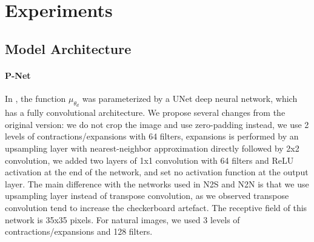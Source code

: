 \documentclass{article}
\begin{document}


\section{Experiments}
\subsection{Model Architecture}
\paragraph{P-Net}
In \cite{ronneberger2015u}, the function $\mu_{\theta_d}$ was parameterized by a UNet  deep neural network, which has a fully convolutional architecture.
We propose several changes from the original version: we do not crop the image and use zero-padding instead, we use 2 levels of contractions/expansions with 64 filters, expansions is performed by an upsampling layer with nearest-neighbor approximation directly followed by 2x2 convolution, we added two layers of 1x1 convolution with 64 filters and ReLU activation at the end of the network, and set no activation function at the output layer.
The main difference with the networks used in N2S and N2N is that we use upsampling layer instead of transpose convolution, as we observed transpose convolution tend to increase the checkerboard artefact.
The receptive field of this network is 35x35 pixels.
For natural images, we used 3 levels of contractions/expansions and 128 filters.
\end{document}

